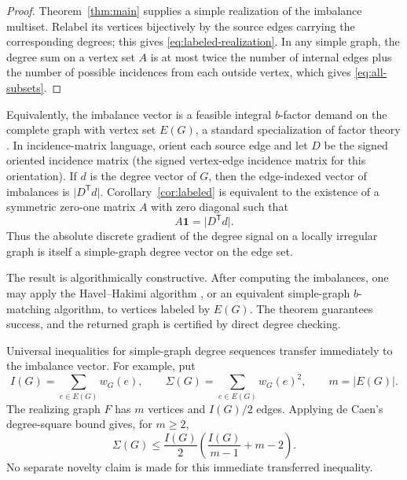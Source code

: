 \documentclass[a4paper,11pt]{amsart}
\numberwithin{equation}{section}
\theoremstyle{definition}
\theoremstyle{remark}
\newcommand{\one}{\mathbf 1}
\begin{document}
\begin{proof}
Theorem~\ref{thm:main} supplies a simple realization of the imbalance multiset.  Relabel its vertices bijectively by the source edges carrying the corresponding degrees; this gives \eqref{eq:labeled-realization}.  In any simple graph, the degree sum on a vertex set $A$ is at most twice the number of internal edges plus the number of possible incidences from each outside vertex, which gives \eqref{eq:all-subsets}.
\end{proof}

Equivalently, the imbalance vector is a feasible integral $b$-factor demand on the complete graph with vertex set $E(G)$, a standard specialization of factor theory \cite{Tutte1952}.  In incidence-matrix language, orient each source edge and let $D$ be the signed oriented incidence matrix (the signed vertex-edge incidence matrix for this orientation).  If $d$ is the degree vector of $G$, then the edge-indexed vector of imbalances is $\lvert D^{\mathsf T}d\rvert$.  Corollary~\ref{cor:labeled} is equivalent to the existence of a symmetric zero-one matrix $A$ with zero diagonal such that
\begin{equation}
A\one=\lvert D^{\mathsf T}d\rvert.
\label{eq:incidence-form}
\end{equation}
Thus the absolute discrete gradient of the degree signal on a locally irregular graph is itself a simple-graph degree vector on the edge set.

The result is algorithmically constructive.  After computing the imbalances, one may apply the Havel--Hakimi algorithm \cite{Havel1955,Hakimi1962}, or an equivalent simple-graph $b$-matching algorithm, to vertices labeled by $E(G)$.  The theorem guarantees success, and the returned graph is certified by direct degree checking.

Universal inequalities for simple-graph degree sequences transfer immediately to the imbalance vector.  For example, put
\begin{equation}
I(G)=\sum_{e\in E(G)}w_G(e),
\qquad
\Sigma(G)=\sum_{e\in E(G)}w_G(e)^2,
\qquad
m=\lvert E(G)\rvert.
\end{equation}
The realizing graph $F$ has $m$ vertices and $I(G)/2$ edges.  Applying de Caen's degree-square bound \cite{deCaen1998} gives, for $m\ge2$,
\begin{equation}
\Sigma(G)
\le\frac{I(G)}2\left(\frac{I(G)}{m-1}+m-2\right).
\label{eq:de-caen-transfer}
\end{equation}
No separate novelty claim is made for this immediate transferred inequality.
\end{document}
